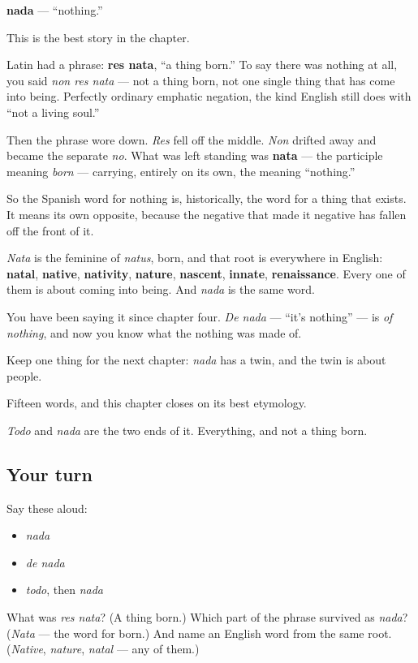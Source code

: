 \begin{cousinweb}
\textbf{nada} — \textquotedblleft{}nothing.\textquotedblright{}

This is the best story in the chapter.

Latin had a phrase: \textbf{res nata}, \textquotedblleft{}a thing born.\textquotedblright{} To say there was nothing at all, you said \emph{non res nata} — not a thing born, not one single thing that has come into being. Perfectly ordinary emphatic negation, the kind English still does with \textquotedblleft{}not a living soul.\textquotedblright{}

Then the phrase wore down. \emph{Res} fell off the middle. \emph{Non} drifted away and became the separate \emph{no}. What was left standing was \textbf{nata} — the participle meaning \emph{born} — carrying, entirely on its own, the meaning \textquotedblleft{}nothing.\textquotedblright{}

So the Spanish word for nothing is, historically, the word for a thing that exists. It means its own opposite, because the negative that made it negative has fallen off the front of it.

\emph{Nata} is the feminine of \emph{natus}, born, and that root is everywhere in English: \textbf{natal}, \textbf{native}, \textbf{nativity}, \textbf{nature}, \textbf{nascent}, \textbf{innate}, \textbf{renaissance}. Every one of them is about coming into being. And \emph{nada} is the same word.

You have been saying it since chapter four. \emph{De nada} — \textquotedblleft{}it's nothing\textquotedblright{} — is \emph{of nothing}, and now you know what the nothing was made of.

Keep one thing for the next chapter: \emph{nada} has a twin, and the twin is about people.
\end{cousinweb}

\begin{grammarlens}[title={What you've built}]
Fifteen words, and this chapter closes on its best etymology.

\emph{Todo} and \emph{nada} are the two ends of it. Everything, and not a thing born.
\end{grammarlens}

\subsection*{Your turn}
Say these aloud:

\begin{itemize}
\raggedright
  \item \emph{nada}
  \item \emph{de nada}
  \item \emph{todo}, then \emph{nada}
\end{itemize}

\begin{tcolorbox}[breakable,colback=teal!4,colframe=teal!35!black,title={Before you move on}]
What was \emph{res nata}? (A thing born.) Which part of the phrase survived as \emph{nada}? (\emph{Nata} — the word for born.) And name an English word from the same root. (\emph{Native}, \emph{nature}, \emph{natal} — any of them.)
\end{tcolorbox}

